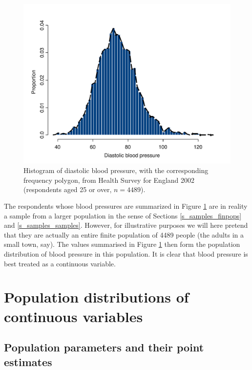 \begin{figure}
\caption{Histogram of diastolic blood pressure, with the corresponding
frequency polygon, from Health Survey for
England 2002 (respondents aged 25 or over, $n=4489$).}
\label{f_bp1}
\begin{center}
\vspace*{-4ex}
\includegraphics[width=13.5cm]{bloodp1}
\end{center}
\end{figure}

The respondents whose blood pressures are summarized in Figure
\ref{f_bp1} are in reality a sample from a larger population in the
sense of Sections \ref{s_samples_finpops} and \ref{s_samples_samples}.
However, for illustrative purposes we will here pretend that they are
actually an entire finite population of 4489 people (the adults in a
small town, say). The values summarised in Figure \ref{f_bp1} then form
the population distribution of blood pressure in this population. It is
clear that blood pressure is best treated as a continuous variable.


\section{Population distributions of continuous variables}
\label{s_contd_popdistrs}

\subsection{Population parameters and their point estimates}
\label{ss_contd_popdistrs_params}

